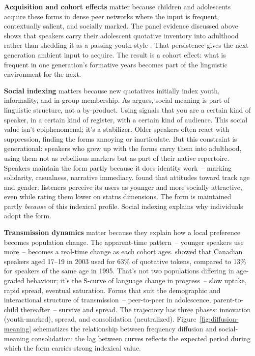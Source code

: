 \textbf{Acquisition and cohort effects} matter because children and adolescents acquire these forms in dense peer networks where the input is frequent, contextually salient, and socially marked. The panel evidence discussed above shows that speakers carry their adolescent quotative inventory into adulthood rather than shedding it as a passing youth style \autocite{tagliamontedarcy2007}. That persistence gives the next generation ambient input to acquire. The result is a cohort effect: what is frequent in one generation's formative years becomes part of the linguistic environment for the next.

\textbf{Social indexing} matters because new quotatives initially index youth, informality, and in-group membership. As \textcite{Eckert2012} argues, social meaning is part of linguistic structure, not a by-product. Using  signals that you are a certain kind of speaker, in a certain kind of register, with a certain kind of audience. This social value isn't epiphenomenal; it's a stabilizer. Older speakers often react with suppression, finding the forms annoying or inarticulate. But this constraint is generational: speakers who grew up with the forms carry them into adulthood, using them not as rebellious markers but as part of their native repertoire. Speakers maintain the form partly because it does identity work~-- marking solidarity, casualness, narrative immediacy. \textcite{buchstaller2014} found that attitudes toward  track age and gender: listeners perceive its users as younger and more socially attractive, even while rating them lower on status dimensions. The form is maintained partly \emph{because} of this indexical profile. Social indexing explains why individuals adopt the form.

\textbf{Transmission dynamics} matter because they explain how a local preference becomes population change. The apparent-time pattern~-- younger speakers use  more~-- becomes a real-time change as each cohort ages. \textcite{tagliamontedarcy2004} showed that Canadian speakers aged 17--19 in 2003 used  for 63\% of quotative tokens, compared to 13\% for speakers of the same age in 1995. That's not two populations differing in age-graded behaviour; it's the S-curve of language change in progress~-- slow uptake, rapid spread, eventual saturation. Forms that suit the demographic and interactional structure of transmission~-- peer-to-peer in adolescence, parent-to-child thereafter~-- survive and spread. The trajectory has three phases: innovation (youth-marked), spread, and consolidation (neutralized). Figure~\ref{fig:diffusion-meaning} schematizes the relationship between frequency diffusion and social-meaning consolidation: the lag between curves reflects the expected period during which the form carries strong indexical value.

